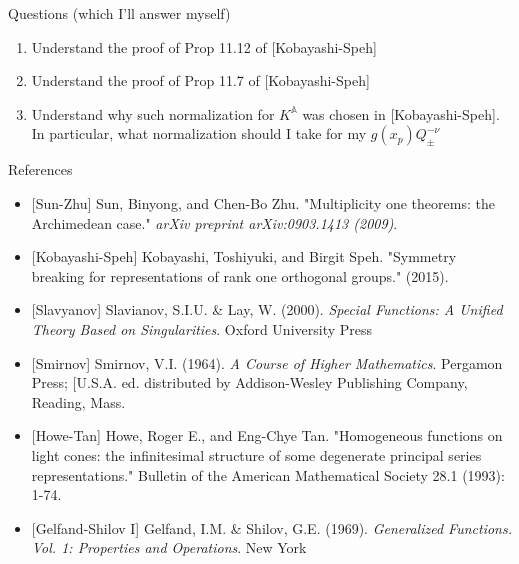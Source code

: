 \documentclass[8pt]{beamer}
\theoremstyle{mystyle}
\begin{document}
\begin{frame}{Questions (which I'll answer myself)}
	\begin{enumerate}
		\item Understand the proof of Prop 11.12 of [Kobayashi-Speh]
		\item Understand the proof of Prop 11.7 of [Kobayashi-Speh]
		\item Understand why such normalization for $K^\mathbb{A}$ was chosen in [Kobayashi-Speh]. In particular, what
			normalization should I take for my $g(x_p)Q_{\pm}^{-\nu}$
	\end{enumerate}
\end{frame}
\begin{frame}{References}
	\begin{itemize}
		\item {[Sun-Zhu]} Sun, Binyong, and Chen-Bo Zhu. "Multiplicity one theorems: the Archimedean case." 
			{\it arXiv preprint arXiv:0903.1413 (2009)}.
		\item {[Kobayashi-Speh]} Kobayashi, Toshiyuki, and Birgit Speh. "Symmetry breaking for representations of rank one orthogonal groups." (2015).
		\item {[Slavyanov]} Slavianov, S.I.U. \&
			Lay, W. (2000). {\it Special Functions: A Unified Theory Based on Singularities}. Oxford University Press
		\item {[Smirnov]} Smirnov, V.I. (1964). {\it A Course of Higher Mathematics}.
			Pergamon Press; [U.S.A. ed. distributed by Addison-Wesley Publishing Company, Reading, Mass.
			\item {[Howe-Tan]} Howe, Roger E., and Eng-Chye Tan. "Homogeneous functions on light cones: the infinitesimal structure of some degenerate principal series representations." Bulletin of the American Mathematical Society 28.1 (1993): 1-74.
		\item {[Gelfand-Shilov I]} Gelfand, I.M. \& Shilov, G.E. (1969).
				{\it Generalized Functions. Vol. 1: Properties and Operations}. New York
	\end{itemize}
\end{frame}
\end{document}
